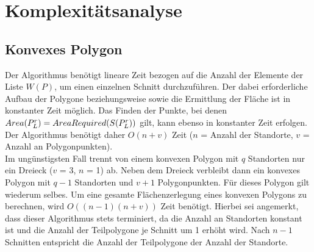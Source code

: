 \documentclass[ngerman]{seminarbeitrag}
\begin{document}
\section{Komplexitätsanalyse}\label{komplex}
\subsection{Konvexes Polygon}
Der Algorithmus \con benötigt lineare Zeit bezogen auf die Anzahl der Elemente der Liste $W(P)$, um einen einzelnen Schnitt durchzuführen. Der dabei erforderliche Aufbau der Polygone \prl beziehungsweise \pll sowie die Ermittlung der Fläche ist in konstanter Zeit möglich. Das Finden der Punkte, bei denen $Area(P_{L}^{r}) = AreaRequired(S(P_{L}^{r}))$ gilt, kann ebenso in konstanter Zeit erfolgen. Der Algorithmus \con benötigt daher $O(n+v)$ Zeit ($n$ = Anzahl der Standorte, $v$ = Anzahl an Polygonpunkten).\\
Im ungünstigsten Fall trennt \con von einem konvexen Polygon mit $q$ Standorten nur ein Dreieck ($v$ = 3, $n$ = 1) ab. Neben dem Dreieck verbleibt dann ein konvexes Polygon mit $q-1$ Standorten und $v+1$ Polygonpunkten. Für dieses Polygon gilt wiederum selbes. Um eine gesamte Flächenzerlegung eines konvexen Polygons zu berechnen, wird $O((n-1)(n+v))$ Zeit benötigt. 
Hierbei sei angemerkt, dass dieser Algorithmus stets terminiert, da die Anzahl an Standorten konstant ist und die Anzahl der Teilpolygone je Schnitt um 1 erhöht wird. Nach $n-1$ Schnitten entspricht die Anzahl der Teilpolygone der Anzahl der Standorte.
\end{document}
